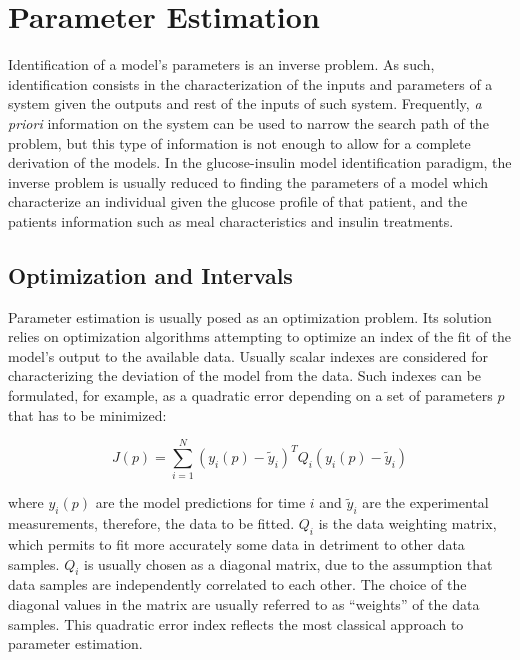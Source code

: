 \chapter{Parameter Estimation}
\label{sec:Parameter estimation}

Identification of a model's parameters is an inverse problem. As such, identification consists in the characterization of the inputs and parameters of a system given the outputs and rest of the inputs of such system. Frequently, \textit{a priori} information on the system can be used to narrow the search path of the problem, but this type of information is not enough to allow for a complete derivation of the models. In the glucose-insulin model identification paradigm, the inverse problem is usually reduced to finding the parameters of a model which characterize an individual given the glucose profile of that patient, and the patients information such as meal characteristics and insulin treatments.

\section{Optimization and Intervals}
\label{sec:OptimizationAndIntervals}

Parameter estimation is usually posed as an optimization problem. Its solution relies on optimization algorithms attempting to optimize an index of the fit of the model's output to the available data. Usually scalar indexes are considered for characterizing the deviation of the model from the data. Such indexes can be formulated, for example, as a quadratic error depending on a set of parameters $p$ that has to be minimized:

\begin{equation}
	J(p)=\sum_{i=1}^{N}(y_{i}(p)-\tilde{y}_{i})^{T}Q_{i}(y_{i}(p)-\tilde{y}_{i})
\label{eq:quadraticindex}
\end{equation}

where $y_{i}(p)$ are the model predictions for time $i$ and $\tilde{y}_{i}$ are the experimental measurements, therefore, the data to be fitted. $Q_{i}$ is the data weighting matrix, which permits to fit more accurately some data in detriment to other data samples.  $Q_{i}$ is usually chosen as a diagonal matrix, due to the assumption that data samples are independently correlated to each other. The choice of the diagonal values in the matrix are usually referred to as ``weights'' of the data samples. This quadratic error index reflects the most classical approach to parameter estimation.

